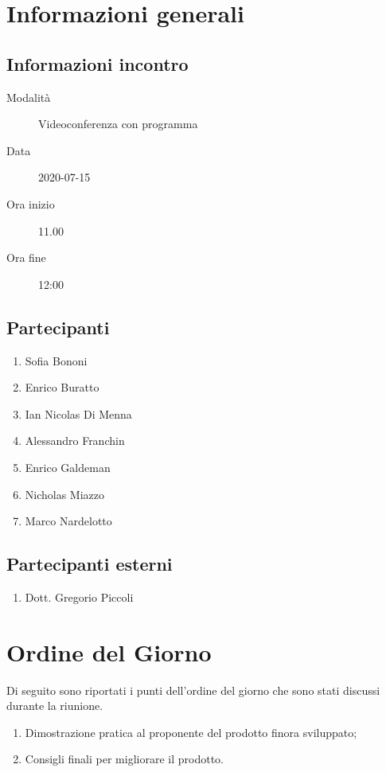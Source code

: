 \documentclass{article}
\begin{document}


\section{Informazioni generali}%
\label{sec:informazioni_generali}

\subsection{Informazioni incontro}%
\label{sub:informazioni_incontro}

\begin{description}
  \item[Modalità] Videoconferenza con programma 
  \item[Data] 2020-07-15
  \item[Ora inizio] 11.00
  \item[Ora fine] 12:00
\end{description}

\subsection{Partecipanti}%
\label{sub:partecipanti}

\begin{enumerate}
  \item Sofia Bononi
  \item Enrico Buratto
  \item Ian Nicolas Di Menna
  \item Alessandro Franchin
  \item Enrico Galdeman
  \item Nicholas Miazzo
  \item Marco Nardelotto
\end{enumerate}

\subsection{Partecipanti esterni}%
\label{sub:partecipanti esterni}

\begin{enumerate}
    \item Dott. Gregorio Piccoli
\end{enumerate}


\section{Ordine del Giorno}%
\label{ordine_del_giorno}
Di seguito sono riportati i punti dell'ordine del giorno che sono stati discussi durante la riunione.
\begin{enumerate}
  \item Dimostrazione pratica al proponente del prodotto finora sviluppato;
  \item Consigli finali per migliorare il prodotto.
\end{enumerate}
\end{document}
